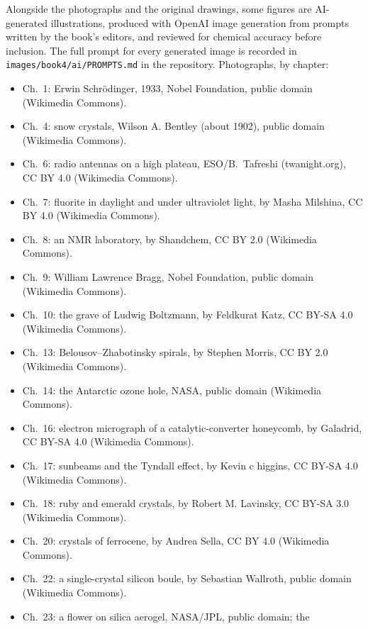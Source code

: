 \bigskip
Alongside the photographs and the original drawings, some figures are
AI-generated illustrations, produced with OpenAI image generation from
prompts written by the book's editors, and reviewed for chemical
accuracy before inclusion. The full prompt for every generated image is
recorded in \texttt{images/book4/ai/PROMPTS.md} in the repository.
\bigskip
\noindent Photographs, by chapter:
\begin{itemize}\small
  \item Ch.~1: Erwin Schr\"odinger, 1933, Nobel Foundation, public domain
        (Wikimedia Commons).
  \item Ch.~4: snow crystals, Wilson A. Bentley (about 1902), public domain
        (Wikimedia Commons).
  \item Ch.~6: radio antennas on a high plateau, ESO/B.~Tafreshi
        (twanight.org), CC BY 4.0 (Wikimedia Commons).
  \item Ch.~7: fluorite in daylight and under ultraviolet light, by Masha
        Milshina, CC BY 4.0 (Wikimedia Commons).
  \item Ch.~8: an NMR laboratory, by Shandchem, CC BY 2.0 (Wikimedia
        Commons).
  \item Ch.~9: William Lawrence Bragg, Nobel Foundation, public domain
        (Wikimedia Commons).
  \item Ch.~10: the grave of Ludwig Boltzmann, by Feldkurat Katz,
        CC BY-SA 4.0 (Wikimedia Commons).
  \item Ch.~13: Belousov--Zhabotinsky spirals, by Stephen Morris, CC BY 2.0
        (Wikimedia Commons).
  \item Ch.~14: the Antarctic ozone hole, NASA, public domain (Wikimedia
        Commons).
  \item Ch.~16: electron micrograph of a catalytic-converter honeycomb, by
        Galadrid, CC BY-SA 4.0 (Wikimedia Commons).
  \item Ch.~17: sunbeams and the Tyndall effect, by Kevin c higgins, CC BY-SA 4.0
        (Wikimedia Commons).
  \item Ch.~18: ruby and emerald crystals, by Robert M. Lavinsky, CC BY-SA 3.0
        (Wikimedia Commons).
  \item Ch.~20: crystals of ferrocene, by Andrea Sella, CC BY 4.0 (Wikimedia
        Commons).
  \item Ch.~22: a single-crystal silicon boule, by Sebastian Wallroth, public
        domain (Wikimedia Commons).
  \item Ch.~23: a flower on silica aerogel, NASA/JPL, public domain; the

\end{itemize}
